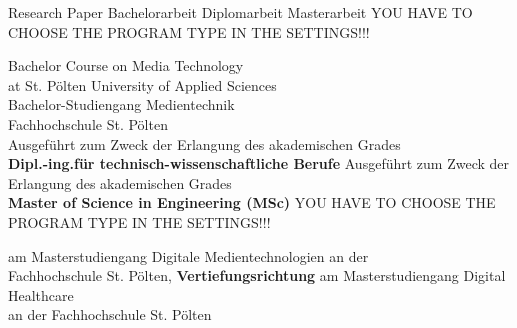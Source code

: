 \begin{center}

\vspace{1cm}

\begin{minipage}[t][5cm][s]{\textwidth}%
\centering
\Huge{{\color{FH2}{\fontsize{24}{30} \selectfont \workTitle\\}}}
\vspace{0.5cm}
\LARGE{{\color{FH2}{\fontsize{16}{24} \selectfont \subTitle\\}}}
\end{minipage}

\vspace{1cm}

\ifuseBachelorDigitalMediaTechnologiesOne
	\LARGE{Research Paper}
\else
	\ifuseBachelorDigitalMediaTechnologiesTwo
		\LARGE{Bachelorarbeit}
\else
	\ifuseMasterDigitalMediaTechnologies
		\LARGE{Diplomarbeit}
\else
	\ifuseMasterDigitalHealthCare
		\LARGE{Masterarbeit}
    \else
        \LARGE{YOU HAVE TO CHOOSE THE PROGRAM TYPE IN THE SETTINGS!!!}
  	\fi
\fi
\fi
\fi


\vspace{1.3cm}
\ifuseBachelorDigitalMediaTechnologiesOne
	\fontsize{11pt}{15pt}\selectfont Bachelor Course on Media Technology\\
at St. Pölten University of Applied Sciences\\  
\else
	\ifuseBachelorDigitalMediaTechnologiesTwo
		\fontsize{11pt}{15pt}\selectfont Bachelor-Studiengang Medientechnik\\
Fachhochschule St. Pölten\\  
\else
	\ifuseMasterDigitalMediaTechnologies
		\fontsize{11pt}{15pt}\selectfont Ausgeführt zum Zweck der Erlangung des akademischen Grades\\
		\textbf{Dipl.-ing.für technisch-wissenschaftliche Berufe}
\else
	\ifuseMasterDigitalHealthCare
    	\fontsize{11pt}{15pt}\selectfont Ausgeführt zum Zweck der Erlangung des akademischen Grades\\
		\textbf{Master of Science in Engineering (MSc)}
    \else
        \LARGE{YOU HAVE TO CHOOSE THE PROGRAM TYPE IN THE SETTINGS!!!}
  	\fi
\fi
\fi
\fi

\vspace{4mm}

\ifuseMasterDigitalMediaTechnologies
	am Masterstudiengang Digitale Medientechnologien an der\\ 
Fachhochschule St. Pölten, \textbf{Vertiefungsrichtung \specialization} 
\else
	\ifuseMasterDigitalHealthCare
		am Masterstudiengang Digital Healthcare\\ 
an der Fachhochschule St. Pölten
    \else
        

\end{center}
